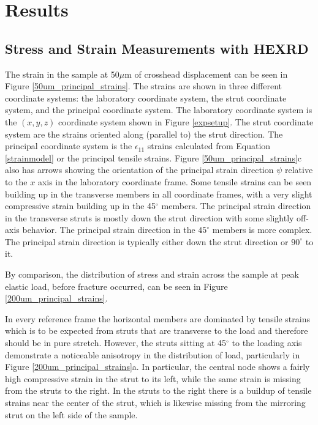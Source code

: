 \section{Results}
\subsection{Stress and Strain Measurements with HEXRD}
The strain in the sample at 50$\mu$m of crosshead displacement can be seen in Figure \ref{50um_principal_strains}. The strains are shown in three different coordinate systems: the laboratory coordinate system, the strut coordinate system, and the principal coordinate system. The laboratory coordinate system is the $(x,y,z)$ coordinate system shown in Figure \ref{expsetup}. The strut coordinate system are the strains oriented along (parallel to) the strut direction. The principal coordinate system is the $\epsilon_{11}$ strains calculated from Equation \ref{strainmodel} or the principal tensile strains. Figure \ref{50um_principal_strains}c also has arrows showing the orientation of the principal strain direction $\psi$ relative to the $x$ axis in the laboratory coordinate frame. Some tensile strains can be seen building up in the transverse members in all coordinate frames, with a very slight compressive strain building up in the 45$^\circ$ members. The principal strain direction in the transverse struts is mostly down the strut direction with some slightly off-axis behavior. The principal strain direction in the $45^\circ$ members is more complex. The principal strain direction is typically either down the strut direction or $90^\circ$ to it. 

By comparison, the distribution of stress and strain across the sample at peak elastic load, before fracture occurred, can be seen in Figure \ref{200um_principal_strains}. 

In every reference frame the horizontal members are dominated by tensile strains which is to be expected from struts that are transverse to the load and therefore should be in pure stretch. However, the struts sitting at 45$^\circ$ to the loading axis demonstrate a noticeable anisotropy in the distribution of load, particularly in Figure \ref{200um_principal_strains}a. In particular, the central node shows a fairly high compressive strain in the strut to its left, while the same strain is missing from the struts to the right. In the struts to the right there is a buildup of tensile strains near the center of the strut, which is likewise missing from the mirroring strut on the left side of the sample.

